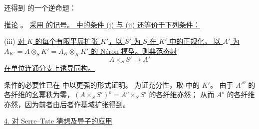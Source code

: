 还得到  的一个逆命题：

\medskip
\noindent
\underline{推论} 。
\underline{采用  的记号。
 中的条件 (i) 与 (ii) 还等价于下列条件：}

\smallskip
\noindent
(iii) \quad \underline{对 $K$ 的每个有限平展扩张 $K'$，以 $S'$ 为 $S$ 在 $K'$ 中的正规化，
以 $A'$ 为 $A_{K'}=$\allowbreak $A\otimes_SK'=$\allowbreak $A_K\otimes_KK'$ 的 N\'eron 模型。则典范态射}
\[
 A\times_SS'\longrightarrow A'
\]
\underline{在单位连通分支上诱导同构。}

条件的必要性已在  中以更强的形式证明。
为证充分性，取  中的 $K'$。
由于 ${A'}^o$ 的各纤维的幺幂秩为零，$(A\times_SS')^o=A^o\times_SS'$ 的各纤维亦然；
从而 $A^o$ 的各纤维亦然，因为前者由后者作基域扩张得到。



\medskip
\noindent
\underline{4. 对 Serre--Tate 猜想及导子的应用}


